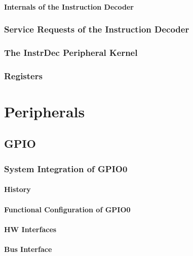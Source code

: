 \subsubsection{Internals of the Instruction Decoder}

\subsection{Service Requests of the Instruction Decoder}

\subsection{The InstrDec Peripheral Kernel}


\subsection{Registers}


\chapter{Peripherals}
\section{GPIO} %
\label{sec:gpiofunc01}
\subsection{System Integration of GPIO0}
\subsubsection{History}


\subsubsection{Functional Configuration of GPIO0}


\subsubsection{HW Interfaces}


\subsubsection{Bus Interface}

